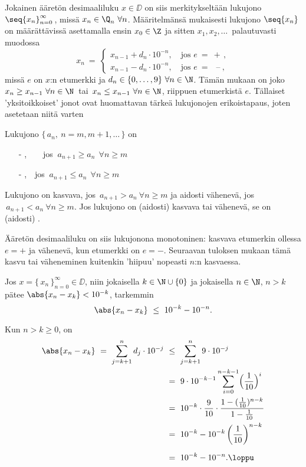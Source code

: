 Jokainen ääretön desimaaliluku $x\in\DD$ on siis merkitykseltään lukujono 
$\seq{x_n}_{n=0}^\infty\,$, missä $x_n\in\Q_n\ \forall n$. Määritelmänsä mukaisesti lukujono 
$\seq{x_n}$ on määrättävissä asettamalla ensin $x_0\in\Z$ ja sitten $x_1,x_2, \ldots\,$ 
palautuvasti muodossa
\[
x_n\ =\ \begin{cases}
         x_{n-1} + d_n \cdot 10^{-n}, \quad \text{jos $e\ =\ +$}\,, \\
         x_{n-1} - d_n \cdot 10^{-n}, \quad \text{jos $e\ =\,\ $ --}\ ,
        \end{cases}
\]
missä $e$ on $x$:n etumerkki ja $d_n\in\{0, \ldots ,9\}\ \forall n\in\N$. Tämän mukaan on
joko $x_n \ge x_{n-1}\ \forall n\in\N\,$ tai $\,x_n \le x_{n-1}\ \forall n\in\N$, riippuen 
etumerkistä $e$. Tällaiset 'yksitoikkoiset' jonot ovat huomattavan tärkeä lukujonojen
erikoistapaus, joten asetetaan niitä varten
\begin{Def} \label{monotoninen jono} 
Lukujono $\{\,a_n,\ n=m,m+1, \ldots\,\}$ on
\begin{itemize}
\item[-] ,\ \ \ \ jos $\ a_{n+1} \ge a_n\ \ \forall n \ge m$
\item[-] ,\ \    jos $\ a_{n+1} \le a_n\ \ \forall n \ge m$
\end{itemize}
Lukujono on  kasvava, jos $\,a_{n+1} > a_n\ \forall n \ge m$ ja aidosti vähenevä,
jos $\,a_{n+1} < a_n\ \forall n \ge m$. Jos lukujono on (aidosti) kasvava tai vähenevä, se on 
(aidosti) .
\end{Def}
Ääretön desimaaliluku on siis lukujonona monotoninen: kasvava etumerkin ollessa $e=+$ ja 
vähenevä, kun etumerkki on $e=-$. Seuraavan tuloksen mukaan tämä kasvu tai väheneminen kuitenkin
'hiipuu' nopeasti $n$:n kasvaessa.
\begin{Prop} \label{desim} Jos $x = \{\,x_n\,\}_{n=0}^{\infty} \in \DD$, niin jokaisella
$k\in\N\cup\{0\}$ ja jokaisella $n\in\N$, $n>k$ pätee $\abs{x_n-x_k}<10^{-k}$, tarkemmin
\[
\abs{x_n - x_k}\ \le\ 10^{-k}-10^{-n}.
\]
\end{Prop}
\tod Kun $n > k \ge 0$, on
\begin{align*}
\abs{x_n - x_k}\ =\ \sum_{j=k+1}^n d_j \cdot 10^{-j}\
                 &\le\ \sum_{j=k+1}^n 9 \cdot 10^{-j} \\
                 &=\ 9 \cdot 10^{-k-1} \sum_{i=0}^{n-k-1} \Bigl(\frac{1}{10}\Bigr)^i \\
                 &=\ 10^{-k} \cdot \dfrac{9}{10} \cdot 
                                    \dfrac{1 - (\frac{1}{10})^{n-k}}{1-\frac{1}{10}} \\
                 &=\ 10^{-k} - 10^{-k}\left(\frac{1}{10}\right)^{n-k} \\[2mm] 
                 &=\ 10^{-k}-10^{-n}. \loppu
\end{align*}
